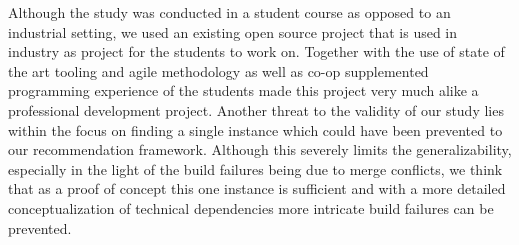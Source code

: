 Although the study was conducted in a student course as opposed to an industrial setting, we used an existing open source project that is used in industry as project for the students to work on.
Together with the use of state of the art tooling and agile methodology as well as co-op supplemented programming experience of the students made this project very much alike a professional development project.
Another threat to the validity of our study lies within the focus on finding a single instance which could have been prevented to our recommendation framework.
Although this severely limits the generalizability, especially in the light of the build failures being due to merge conflicts, we think that as a proof of concept this one instance is sufficient and with a more detailed conceptualization of technical dependencies more intricate build failures can be prevented.
